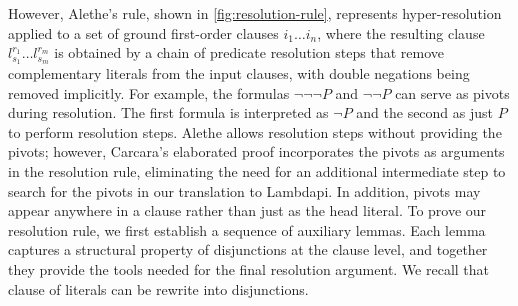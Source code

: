 However, Alethe's  rule, shown in \cref{fig:resolution-rule}, represents hyper-resolution applied to a set of ground first-order clauses $i_1 \dots i_n$,
where the resulting clause $l_{s_1}^{r_1} \dots l_{s_m}^{r_m}$ is obtained by a chain of predicate resolution steps that remove complementary literals from the input clauses, with double negations being removed implicitly.
For example, the formulas $\neg \neg \neg P$ and $\neg \neg P$ can serve as pivots during resolution.
The first formula is interpreted as $\neg P$ and the second as just $P$ to perform resolution steps.
Alethe allows resolution steps without providing the pivots; however, Carcara's elaborated proof incorporates the pivots as arguments in the resolution rule, eliminating the need for an additional intermediate step to search for the pivots in our translation to Lambdapi.
In addition, pivots may appear anywhere in a clause rather than just as the head literal.
To prove our resolution rule, we first establish a sequence of auxiliary lemmas.
Each lemma captures a structural property of disjunctions at the clause level,
and together they provide the tools needed for the final resolution argument.
We recall that clause of literals can be rewrite into disjunctions.

